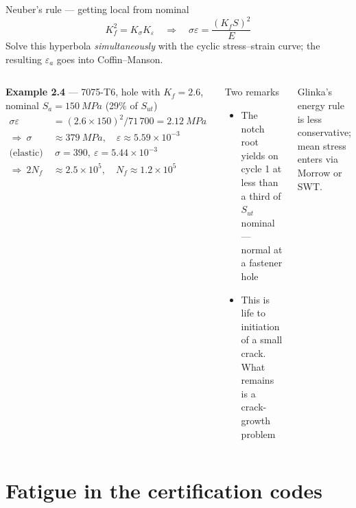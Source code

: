 \documentclass[aspectratio=169,10pt]{beamer}
\begin{document}
\begin{frame}{Neuber's rule --- getting local from nominal}
\footnotesize
\[
K_f^{2}=K_\sigma K_\varepsilon \quad\Longrightarrow\quad \sigma\varepsilon=\frac{(K_f S)^{2}}{E}
\]
Solve this hyperbola \emph{simultaneously} with the cyclic stress--strain curve; the resulting $\varepsilon_a$ goes into Coffin--Manson.
\vspace{4pt}
\begin{columns}[T]
\textbf{Example 2.4} --- 7075-T6, hole with $K_f=2.6$, nominal $S_a=\SI{150}{MPa}$ (29\% of $S_{ut}$)
\begin{align*}
\sigma\varepsilon&=(2.6\times150)^2/71\,700=\SI{2.12}{MPa}\\
\Rightarrow\ \sigma&\approx\SI{379}{MPa},\quad \varepsilon\approx5.59\times10^{-3}\\
\text{(elastic)}\ &\ \sigma=390,\ \varepsilon=5.44\times10^{-3}\\
\Rightarrow\ 2N_f&\approx2.5\times10^{5},\quad N_f\approx1.2\times10^{5}
\end{align*}
\begin{block}{Two remarks}
\begin{itemize}
  \item The notch root yields on cycle 1 at less than a third of $S_{ut}$ nominal --- normal at a fastener hole
  \item This is life to \alert{initiation} of a small crack. What remains is a crack-growth problem
\end{itemize}
\end{block}
\scriptsize Glinka's energy rule is less conservative; mean stress enters via Morrow or SWT.
\end{columns}
\end{frame}

\section{Fatigue in the certification codes}
\end{document}
